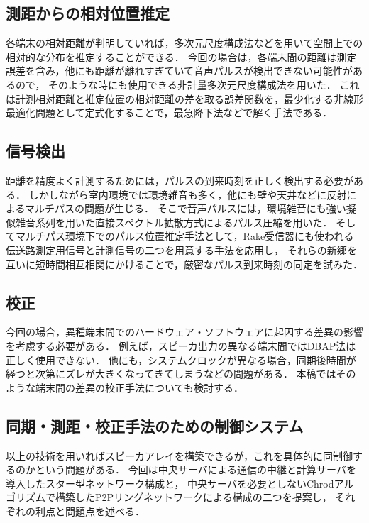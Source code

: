 \documentclass[11pt]{jarticle}
\begin{document}
\subsection{測距からの相対位置推定}

各端末の相対距離が判明していれば，多次元尺度構成法などを用いて空間上での相対的な分布を推定することができる．
今回の場合は，各端末間の距離は測定誤差を含み，他にも距離が離れすぎていて音声パルスが検出できない可能性があるので，
そのような時にも使用できる非計量多次元尺度構成法を用いた．
これは計測相対距離と推定位置の相対距離の差を取る誤差関数を，最少化する非線形最適化問題として定式化することで，最急降下法などで解く手法である．



\subsection{信号検出}

距離を精度よく計測するためには，パルスの到来時刻を正しく検出する必要がある．
しかしながら室内環境では環境雑音も多く，他にも壁や天井などに反射によるマルチパスの問題が生じる．
そこで音声パルスには，環境雑音にも強い擬似雑音系列を用いた直接スペクトル拡散方式によるパルス圧縮を用いた．
そしてマルチパス環境下でのパルス位置推定手法として，Rake受信器にも使われる伝送路測定用信号と計測信号の二つを用意する手法を応用し，
それらの新郷を互いに短時間相互相関にかけることで，厳密なパルス到来時刻の同定を試みた．



\subsection{校正}

今回の場合，異種端末間でのハードウェア・ソフトウェアに起因する差異の影響を考慮する必要がある．
例えば，スピーカ出力の異なる端末間ではDBAP法は正しく使用できない．
他にも，システムクロックが異なる場合，同期後時間が経つと次第にズレが大きくなってきてしまうなどの問題がある．
本稿ではそのような端末間の差異の校正手法についても検討する．


\subsection{同期・測距・校正手法のための制御システム}

以上の技術を用いればスピーカアレイを構築できるが，これを具体的に同制御するのかという問題がある．
今回は中央サーバによる通信の中継と計算サーバを導入したスター型ネットワーク構成と，
中央サーバを必要としないChrodアルゴリズム\cite{chordalg}で構築したP2Pリングネットワークによる構成の二つを提案し，
それぞれの利点と問題点を述べる．
\end{document}
